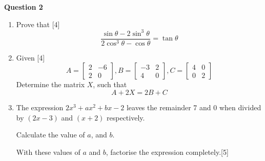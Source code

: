 \par
\noindent
\textbf{Question 2}\\
\begin{enumerate}[label=(\roman*)]

    \item Prove that \hfill [4]
        \[
            \frac{\sin \theta - 2 \sin^3 \theta}{2 \cos^3 \theta - \cos \theta} = \tan \theta
        \]

    \item Given \hfill [4]
        \[
            A = \begin{bmatrix*}  2 & -6 \\ 2 & 0 \end{bmatrix*},
            B = \begin{bmatrix*} -3 &  2 \\ 4 & 0 \end{bmatrix*},
            C = \begin{bmatrix*}  4 &  0 \\ 0 & 2 \end{bmatrix*}
        \]
        Determine the matrix $X$, such that
        \[
            A + 2X = 2B + C
        \]

    \item The expression $2x^3 + ax^2 + bx - 2$ leaves the remainder
        7 and 0 when divided by $(2x-3)$ and $(x+2)$ respectively. 
        
        Calculate the value of $a$, and $b$.

        With these values of $a$ and $b$, factorise the expression 
        completely.\hfill [5]

\end{enumerate}

